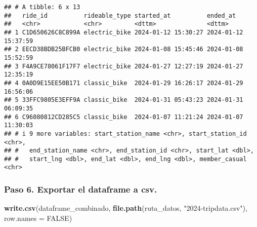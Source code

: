 \documentclass[
]{article}
\newenvironment{Shaded}{\begin{snugshade}}{\end{snugshade}}
\newcommand{\AttributeTok}[1]{\textcolor[rgb]{0.13,0.29,0.53}{#1}}
\newcommand{\ConstantTok}[1]{\textcolor[rgb]{0.56,0.35,0.01}{#1}}
\newcommand{\FunctionTok}[1]{\textcolor[rgb]{0.13,0.29,0.53}{\textbf{#1}}}
\newcommand{\NormalTok}[1]{#1}
\newcommand{\StringTok}[1]{\textcolor[rgb]{0.31,0.60,0.02}{#1}}
\begin{document}
\begin{verbatim}
## # A tibble: 6 x 13
##   ride_id          rideable_type started_at          ended_at           
##   <chr>            <chr>         <dttm>              <dttm>             
## 1 C1D650626C8C899A electric_bike 2024-01-12 15:30:27 2024-01-12 15:37:59
## 2 EECD38BDB25BFCB0 electric_bike 2024-01-08 15:45:46 2024-01-08 15:52:59
## 3 F4A9CE78061F17F7 electric_bike 2024-01-27 12:27:19 2024-01-27 12:35:19
## 4 0A0D9E15EE50B171 classic_bike  2024-01-29 16:26:17 2024-01-29 16:56:06
## 5 33FFC9805E3EFF9A classic_bike  2024-01-31 05:43:23 2024-01-31 06:09:35
## 6 C96080812CD285C5 classic_bike  2024-01-07 11:21:24 2024-01-07 11:30:03
## # i 9 more variables: start_station_name <chr>, start_station_id <chr>,
## #   end_station_name <chr>, end_station_id <chr>, start_lat <dbl>,
## #   start_lng <dbl>, end_lat <dbl>, end_lng <dbl>, member_casual <chr>
\end{verbatim}

\subsubsection{\texorpdfstring{\textbf{Paso 6.} Exportar el dataframe a
csv.}{Paso 6. Exportar el dataframe a csv.}}\label{paso-6.-exportar-el-dataframe-a-csv.}

\begin{Shaded}
\begin{Highlighting}[]
\FunctionTok{write.csv}\NormalTok{(dataframe\_combinado, }\FunctionTok{file.path}\NormalTok{(ruta\_datos, }\StringTok{"2024{-}tripdata.csv"}\NormalTok{), }\AttributeTok{row.names =} \ConstantTok{FALSE}\NormalTok{)}
\end{Highlighting}
\end{Shaded}
\end{document}
